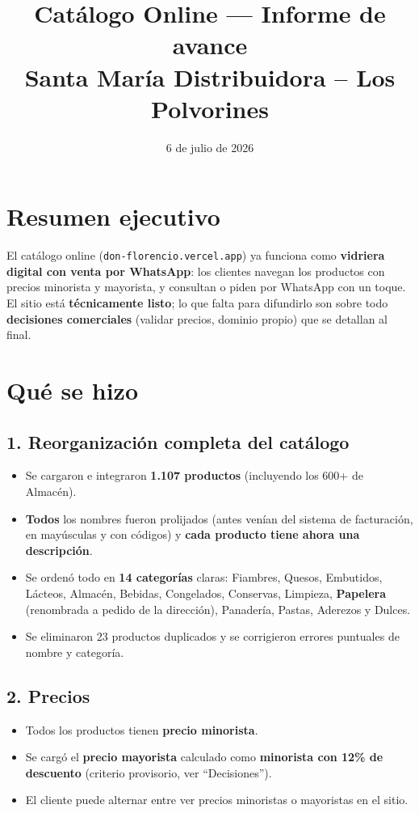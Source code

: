 \documentclass[a4paper,11pt]{article}
\title{\color{vino}\textbf{Cat\'alogo Online --- Informe de avance}\\[4pt]
\large Santa Mar\'ia Distribuidora \--- Los Polvorines}
\author{}
\date{6 de julio de 2026}
\begin{document}
\maketitle
\vspace{-2.5em}

\section*{Resumen ejecutivo}

El cat\'alogo online (\texttt{don-florencio.vercel.app}) ya funciona como \textbf{vidriera digital con venta por WhatsApp}: los clientes navegan los productos con precios minorista y mayorista, y consultan o piden por WhatsApp con un toque. El sitio est\'a \textbf{t\'ecnicamente listo}; lo que falta para difundirlo son sobre todo \textbf{decisiones comerciales} (validar precios, dominio propio) que se detallan al final.

\section{Qu\'e se hizo}

\subsection*{1. Reorganizaci\'on completa del cat\'alogo}
\begin{itemize}[leftmargin=1.2em, itemsep=2pt]
  \item Se cargaron e integraron \textbf{1.107 productos} (incluyendo los 600+ de Almac\'en).
  \item \textbf{Todos} los nombres fueron prolijados (antes ven\'ian del sistema de facturaci\'on, en may\'usculas y con c\'odigos) y \textbf{cada producto tiene ahora una descripci\'on}.
  \item Se orden\'o todo en \textbf{14 categor\'ias} claras: Fiambres, Quesos, Embutidos, L\'acteos, Almac\'en, Bebidas, Congelados, Conservas, Limpieza, \textbf{Papelera} (renombrada a pedido de la direcci\'on), Panader\'ia, Pastas, Aderezos y Dulces.
  \item Se eliminaron 23 productos duplicados y se corrigieron errores puntuales de nombre y categor\'ia.
\end{itemize}

\subsection*{2. Precios}
\begin{itemize}[leftmargin=1.2em, itemsep=2pt]
  \item Todos los productos tienen \textbf{precio minorista}.
  \item Se carg\'o el \textbf{precio mayorista} calculado como \textbf{minorista con 12\% de descuento} (criterio provisorio, ver ``Decisiones'').
  \item El cliente puede alternar entre ver precios minoristas o mayoristas en el sitio.
\end{itemize}
\end{document}
